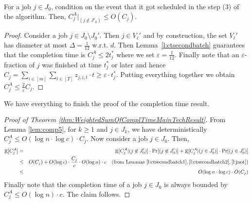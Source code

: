 \begin{lemma}
\label{l:jnot}
For a job $j \in J_0$, condition on the event that it got scheduled in the step (3) of the algorithm. 
Then, $C^A_j |_{(j \not \in J'_0)} \leq O(C_{j})$.
\end{lemma}
\begin{proof}
  Consider a job $j \in J_0 \setminus J_0'$. Then $j \in V_{\ell}'$ and by construction, the
  set $V_{\ell}'$ has diameter at most $\Delta = \frac{1}{12}$ w.r.t. $d$.
  Then Lemma~\ref{l:ctsecondbatch} guarantees that the completion time is $C_j^A \leq 2t_j^*$ where
  we set $\varepsilon = \frac{1}{12}$.
  Finally note that an $\varepsilon$-fraction of $j$ was finished at time $t_j^*$ or later and hence
  $C_j = \sum_{i \in [m]} \sum_{t \in [T]} z_{j,i,t} \cdot t \geq \varepsilon \cdot t_j^*$. 
 Putting everything together we obtain $C_j^A \leq \frac{2}{\varepsilon} C_j$.
\end{proof}



We have everything to finish the proof of the completion time result.

\begin{proof}[ Proof of Theorem \ref{thm:WeightedSumOfComplTimeMainTechResult}]
From Lemma \ref{lem:comp5}, for $k \geq 1$ and  $ j \in J_k$,  we have deterministically $C^{A}_j \leq O(\log n \cdot \log c) \cdot C_j$.
Now consider a job $j \in J_0$. Then,
\begin{eqnarray*}
\mathop{\mathbb{E}}[C^A_j]  &=& \mathop{\mathbb{E}}[C^A_j | (j \not \in J'_0)] \cdot \text{Pr}[ (j \not \in J'_0)] + \mathop{\mathbb{E}}[C^A_j | (j  \in J'_0)] \cdot \text{Pr}[ (j \in J'_0)]  \\
&\leq& O(C_j) + O(\log c) \cdot \frac{C_j}{c}  \cdot O(\log n) \cdot c \quad (\text{from Lemmas } \ref{l:ctsecondbatch1}, \ref{l:ctsecondbatch2}, \ref{l:jnot} ) \\
&\leq& O(\log n \cdot \log c) \cdot O(C_j)
\end{eqnarray*}
Finally note that the completion time of a job $j \in J_0$ is always bounded by $C_j^A \leq O(\log n) \cdot c$. The claim follows.
\end{proof}


